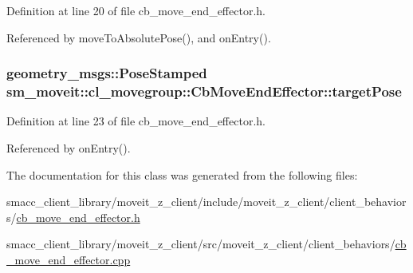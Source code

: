 Definition at line 20 of file cb\+\_\+move\+\_\+end\+\_\+effector.\+h.



Referenced by move\+To\+Absolute\+Pose(), and on\+Entry().

\subsubsection[{\texorpdfstring{target\+Pose}{targetPose}}]{\setlength{\rightskip}{0pt plus 5cm}geometry\+\_\+msgs\+::\+Pose\+Stamped sm\+\_\+moveit\+::cl\+\_\+movegroup\+::\+Cb\+Move\+End\+Effector\+::target\+Pose}\hypertarget{classsm__moveit_1_1cl__movegroup_1_1CbMoveEndEffector_aa0b15a6432dd78c81bb242561a712796}{}\label{classsm__moveit_1_1cl__movegroup_1_1CbMoveEndEffector_aa0b15a6432dd78c81bb242561a712796}


Definition at line 23 of file cb\+\_\+move\+\_\+end\+\_\+effector.\+h.



Referenced by on\+Entry().



The documentation for this class was generated from the following files\+:\begin{DoxyCompactItemize}
\item 
smacc\+\_\+client\+\_\+library/moveit\+\_\+z\+\_\+client/include/moveit\+\_\+z\+\_\+client/client\+\_\+behaviors/\hyperlink{cb__move__end__effector_8h}{cb\+\_\+move\+\_\+end\+\_\+effector.\+h}\item 
smacc\+\_\+client\+\_\+library/moveit\+\_\+z\+\_\+client/src/moveit\+\_\+z\+\_\+client/client\+\_\+behaviors/\hyperlink{cb__move__end__effector_8cpp}{cb\+\_\+move\+\_\+end\+\_\+effector.\+cpp}\end{DoxyCompactItemize}
